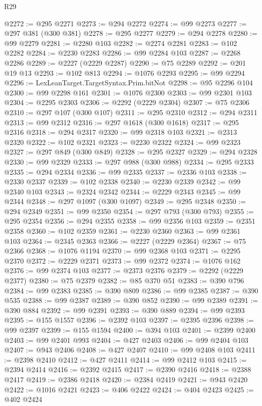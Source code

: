 \begin{lexlean}{R29}
\begin{coremodule}
@2272 := @295 @2271
@2273 := @294 @2272
@2274 := @99 @2273
@2277 := @297 @381 (@300 @381)
@2278 := @295 @2277
@2279 := @294 @2278
@2280 := @99 @2279
@2281 := @2280 @103
@2282 := @2274 @2281
@2283 := @102 @2282
@2284 := @2230 @2283
@2286 := @99 @2284 @103
@2287 := @2268 @2286
@2289 := @2227 (@2229 @2287)
@2290 := @75 @2289
@2292 := @201 @19 @13
@2293 := @102 @813
@2294 := @1076 @2293
@2295 := @99 @2294
@2296 := LexLeanTarget.TargetSyntax.Prim.bitNot
@2298 := @95 @2296 @104
@2300 := @99 @2298 @161
@2301 := @1076 @2300
@2303 := @99 @2301 @103
@2304 := @2295 @2303
@2306 := @2292 (@2229 @2304)
@2307 := @75 @2306
@2310 := @297 @107 (@300 @107)
@2311 := @295 @2310
@2312 := @294 @2311
@2313 := @99 @2312
@2316 := @297 @1618 (@300 @1618)
@2317 := @295 @2316
@2318 := @294 @2317
@2320 := @99 @2318 @103
@2321 := @2313 @2320
@2322 := @102 @2321
@2323 := @2230 @2322
@2324 := @99 @2323
@2327 := @297 @849 (@300 @849)
@2328 := @295 @2327
@2329 := @294 @2328
@2330 := @99 @2329
@2333 := @297 @988 (@300 @988)
@2334 := @295 @2333
@2335 := @294 @2334
@2336 := @99 @2335
@2337 := @2336 @103
@2338 := @2330 @2337
@2339 := @102 @2338
@2340 := @2230 @2339
@2342 := @99 @2340 @103
@2343 := @2324 @2342
@2344 := @2229 @2343
@2345 := @99 @2344
@2348 := @297 @1097 (@300 @1097)
@2349 := @295 @2348
@2350 := @294 @2349
@2351 := @99 @2350
@2354 := @297 @793 (@300 @793)
@2355 := @295 @2354
@2356 := @294 @2355
@2358 := @99 @2356 @103
@2359 := @2351 @2358
@2360 := @102 @2359
@2361 := @2230 @2360
@2363 := @99 @2361 @103
@2364 := @2345 @2363
@2366 := @2227 (@2229 @2364)
@2367 := @75 @2366
@2368 := @1076 @1194
@2370 := @99 @2368 @103
@2371 := @2295 @2370
@2372 := @2229 @2371
@2373 := @99 @2372
@2374 := @1076 @162
@2376 := @99 @2374 @103
@2377 := @2373 @2376
@2379 := @2292 (@2229 @2377)
@2380 := @75 @2379
@2382 := @85 @370 @51
@2383 := @390 @796
@2384 := @99 @2383
@2385 := @390 @809
@2386 := @99 @2385
@2387 := @390 @535
@2388 := @99 @2387
@2389 := @390 @852
@2390 := @99 @2389
@2391 := @390 @884
@2392 := @99 @2391
@2393 := @390 @889
@2394 := @99 @2393
@2395 := @155 @1557
@2396 := @2392 @103
@2397 := @2395 @2396
@2398 := @99 @2397
@2399 := @155 @1594
@2400 := @394 @103
@2401 := @2399 @2400
@2403 := @99 @2401 @993
@2404 := @427 @2403
@2406 := @99 @2404 @103
@2407 := @943 @2406
@2408 := @427 @2407
@2410 := @99 @2408 @103
@2411 := @2398 @2410
@2412 := @427 @2411
@2414 := @99 @2412 @103
@2415 := @2394 @2414
@2416 := @2392 @2415
@2417 := @2390 @2416
@2418 := @2388 @2417
@2419 := @2386 @2418
@2420 := @2384 @2419
@2421 := @943 @2420
@2422 := @1016 @2421
@2423 := @406 @2422
@2424 := @404 @2423
@2425 := @402 @2424

\end{coremodule}
\end{lexlean}
